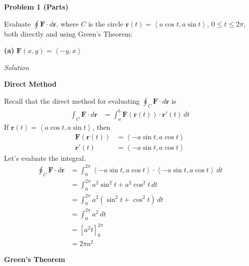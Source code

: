 \documentclass{article}
\newcommand{\lrp}[1]{\left( #1 \right)}
\newcommand{\lra}[1]{\left\langle #1 \right\rangle}
\newcommand{\lrb}[1]{\left[ #1 \right]}
\renewcommand{\r}[0]{\mathbf{r}}
\newcommand{\F}[0]{\mathbf{F}}
\newcommand{\Solution}{\textit{Solution}}
\begin{document}
{}\textbf{Problem 1 (Parts)}

Evaluate $\displaystyle \oint \F\cdot d\r$, where $C$ is the circle $\r(t)=\lra{a\cos t, a\sin t}$, $0\leq t \leq 2\pi$, both directly and using Green's Theorem:

{}\textbf{(a)} $\F(x,y)=\lra{-y,x}$

\Solution

{}\textbf{Direct Method}

Recall that the direct method for evaluating $\displaystyle \oint_C \F\cdot d\r$ is
\begin{align*}
    \int_C \F\cdot d\r&=\int_a^b \F\lrp{\r(t)}\cdot \r'(t)\,dt
\end{align*}
If $\r(t)=\lra{a\cos t, a\sin t}$, then
\begin{align*}
    \F\lrp{\r(t)}&=\lra{-a\sin t, a\cos t}\\
    \r'(t)&=\lra{-a\sin t,a \cos t}
\end{align*}
Let's evaluate the integral.
\begin{align*}
    \oint_C \F\cdot d\r &= \int_0^{2\pi}\lra{-a\sin t, a\cos t}\cdot \lra{-a\sin t,a \cos t}\,dt\\
    &=\int_0^{2\pi} a^2\sin^2 t +a^2\cos ^2 t\,dt\\
    &=\int_0^{2\pi} a^2(\sin^2 t+\cos ^2 t)\,dt\\
    &=\int_0^{2\pi}a^2\,dt\tag{$\sin^2 t+\cos^2 t=1$}\\
    &=\lrb{a^2t}_0^{2\pi}\\
    &=\boxed{2\pi a^2}
\end{align*}

{}\textbf{Green's Theorem}
\end{document}
